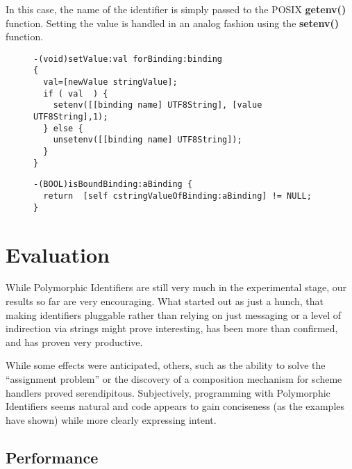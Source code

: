 \documentclass[preprint,authoryear]{llncs}
\begin{document}
In this case, the name of the identifier is simply passed to the POSIX {\bf getenv()} function.
Setting the value is handled in an analog fashion using the {\bf setenv()} function.


\begin{figure}[htbp]
\begin{lstlisting}[style=L,label=setvalue-env,caption=Set value in env: scheme.]
-(void)setValue:val forBinding:binding
{
  val=[newValue stringValue];
  if ( val  ) {
    setenv([[binding name] UTF8String], [value UTF8String],1);
  } else {
    unsetenv([[binding name] UTF8String]);
  }
}
\end{lstlisting}
\end{figure}


\begin{figure}[htbp]
\begin{lstlisting}[style=L,label=hasValue-env,caption=Checking for presence of value in env: scheme.]
-(BOOL)isBoundBinding:aBinding {
  return  [self cstringValueOfBinding:aBinding] != NULL;
}
\end{lstlisting}
\end{figure}




\section{Evaluation}
\label{evaluation}

While Polymorphic Identifiers are still very much in the experimental stage, our
results so far are very encouraging.  What started out as just a hunch, that making
identifiers pluggable rather than relying on just messaging or a level of indirection
via strings might prove interesting, has been more than confirmed, and has proven
very productive.

While some effects were anticipated, others, such as the ability to solve the
``assignment problem'' or the discovery of a composition mechanism for
scheme handlers proved serendipitous.  Subjectively, programming with Polymorphic
Identifiers seems natural and code appears to gain conciseness (as the examples
have shown) while more clearly expressing intent.


\subsection{Performance}
\end{document}
